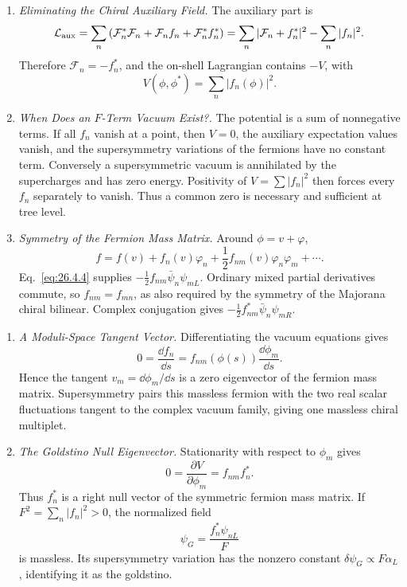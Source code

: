 \begin{enumerate}
  \begin{enumerate}
    \item \emph{Eliminating the Chiral Auxiliary Field.}
    The auxiliary part is
      \[
        \mathcal L_{\rm aux}
          =\sum_n\left(\mathcal F_n^*\mathcal F_n
           +\mathcal F_nf_n+\mathcal F_n^*f_n^*\right)
          =\sum_n|\mathcal F_n+f_n^*|^2-\sum_n|f_n|^2 .
      \]
      Therefore \(\mathcal F_n=-f_n^*\), and the on-shell Lagrangian contains
      \(-V\), with
      \[
        V(\phi,\phi^*)=\sum_n|f_n(\phi)|^2.
      \]
    \item \emph{When Does an \(F\)-Term Vacuum Exist?.}
    The potential is a sum of nonnegative terms.  If all \(f_n\) vanish at a
      point, then \(V=0\), the auxiliary expectation values vanish, and the
      supersymmetry variations of the fermions have no constant term.
      Conversely a supersymmetric vacuum is annihilated by the supercharges and
      has zero energy.  Positivity of
      \(V=\sum|f_n|^2\) then forces every \(f_n\) separately to vanish.  Thus a
      common zero is necessary and sufficient at tree level.
    \item \emph{Symmetry of the Fermion Mass Matrix.}
    Around \(\phi=v+\varphi\),
      \[
        f=f(v)+f_n(v)\varphi_n+\frac12f_{nm}(v)\varphi_n\varphi_m+\cdots .
      \]
      Eq.~\eqref{eq:26.4.4} supplies
      \(-\tfrac12f_{nm}\bar\psi_n\psi_{mL}\).  Ordinary mixed partial
      derivatives commute, so \(f_{nm}=f_{mn}\), as also required by the
      symmetry of the Majorana chiral bilinear.  Complex conjugation gives
      \(-\tfrac12f_{nm}^*\bar\psi_n\psi_{mR}\).
  \end{enumerate}

  \begin{enumerate}
    \item \emph{A Moduli-Space Tangent Vector.}
    Differentiating the vacuum equations gives
      \[
        0=\frac{\dd f_n}{\dd s}
          =f_{nm}(\phi(s))\frac{\dd\phi_m}{\dd s}.
      \]
      Hence the tangent \(v_m=\dd\phi_m/\dd s\) is a zero eigenvector of the
      fermion mass matrix.  Supersymmetry pairs this massless fermion with the
      two real scalar fluctuations tangent to the complex vacuum family, giving
      one massless chiral multiplet.
    \item \emph{The Goldstino Null Eigenvector.}
    Stationarity with respect to \(\phi_m\) gives
      \[
        0=\frac{\partial V}{\partial\phi_m}
          =f_{nm}f_n^*.
      \]
      Thus \(f_n^*\) is a right null vector of the symmetric fermion mass
      matrix.  If \(F^2=\sum_n|f_n|^2>0\), the normalized field
      \[
        \psi_G=\frac{f_n^*\psi_{nL}}{F}
      \]
      is massless.  Its supersymmetry variation has the nonzero constant
      \(\delta\psi_G\propto F\alpha_L\), identifying it as the goldstino.
  \end{enumerate}


\end{enumerate}
